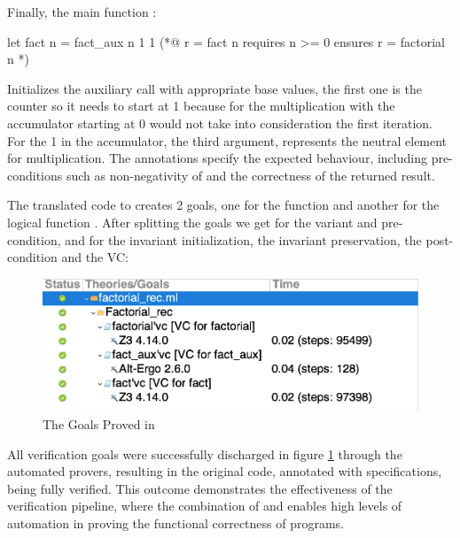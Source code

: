 Finally, the main function :

\begin{gospell}
let fact n = fact_aux n 1 1
(*@ 
  r = fact n
  requires n >= 0 
  ensures r = factorial n
*)
\end{gospell}

Initializes the auxiliary call with appropriate base values, the first one is the counter so it needs to start at 1 because for the 
multiplication with the accumulator starting at 0 would not take into consideration the first iteration. For the 1 in the accumulator, 
the third argument, represents the neutral element for multiplication. The \gospel annotations specify the expected behaviour, including 
pre-conditions such as non-negativity of  and the correctness of the returned result.

The translated code to \whyml creates 2 goals, one for the function  and another for the logical function
. After splitting the goals we get for  the variant and pre-condition, and for
 the invariant initialization, the invariant preservation, the post-condition and the VC:

\begin{figure}[H]
    \centering
    \includegraphics[width=0.7\linewidth]{images/Why3Goals.png}
    \caption{The Goals Proved in \whythree}
    \label{fig:Why3Goals}
\end{figure}

All verification goals were successfully discharged in figure \ref{fig:Why3Goals} through the automated provers, resulting in the 
original \ocaml code, annotated 
with \gospel specifications, being fully verified. This outcome demonstrates the effectiveness of the verification pipeline, 
where the combination of \cameleer and \whythree enables high levels of automation in proving the functional correctness of 
\ocaml programs.